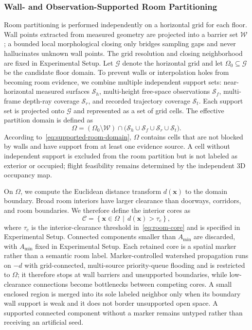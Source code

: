 \documentclass[letterpaper,10pt,journal]{IEEEtran}
\begin{document}
\subsubsection{Wall- and Observation-Supported Room Partitioning}

Room partitioning is performed independently on a horizontal grid for each floor. Wall points extracted from measured geometry are projected into a barrier set $\mathcal W$; a bounded local morphological closing only bridges sampling gaps and never hallucinates unknown wall points. The grid resolution and closing neighborhood are fixed in Experimental Setup. Let $\mathcal G$ denote the horizontal grid and let $\Omega_0\subseteq\mathcal G$ be the candidate floor domain. To prevent walls or interpolation holes from becoming room evidence, we combine multiple independent support sets: near-horizontal measured surfaces $\mathcal S_h$, multi-height free-space observations $\mathcal S_f$, multi-frame depth-ray coverage $\mathcal S_r$, and recorded trajectory coverage $\mathcal S_t$. Each support set is projected onto $\mathcal G$ and represented as a set of grid cells. The effective partition domain is defined as
\begin{equation}
\Omega=(\Omega_0\setminus\mathcal W)\cap
\bigl(\mathcal S_h\cup\mathcal S_f\cup\mathcal S_r\cup\mathcal S_t\bigr).
\label{eq:supported-room-domain}
\end{equation}
According to~\eqref{eq:supported-room-domain}, $\Omega$ contains cells that are not blocked by walls and have support from at least one evidence source. A cell without independent support is excluded from the room partition but is not labeled as exterior or occupied; flight feasibility remains determined by the independent 3D occupancy map.

On $\Omega$, we compute the Euclidean distance transform $d(\mathbf{x})$ to the domain boundary. Broad room interiors have larger clearance than doorways, corridors, and room boundaries. We therefore define the interior cores as
\begin{equation}
\mathcal C=\left\{\mathbf{x}\in\Omega\,\middle|\,
d(\mathbf{x})>\tau_c\right\},
\label{eq:room-core}
\end{equation}
where $\tau_c$ is the interior-clearance threshold in~\eqref{eq:room-core} and is specified in Experimental Setup. Connected components smaller than $A_{\min}$ are discarded, with $A_{\min}$ fixed in Experimental Setup. Each retained core is a spatial marker rather than a semantic room label. Marker-controlled watershed propagation runs on $-d$ with grid-connected, multi-source priority-queue flooding and is restricted to $\Omega$; it therefore stops at wall barriers and unsupported boundaries, while low-clearance connections become bottlenecks between competing cores. A small enclosed region is merged into its sole labeled neighbor only when its boundary wall support is weak and it does not border unsupported open space. A supported connected component without a marker remains untyped rather than receiving an artificial seed.
\end{document}
